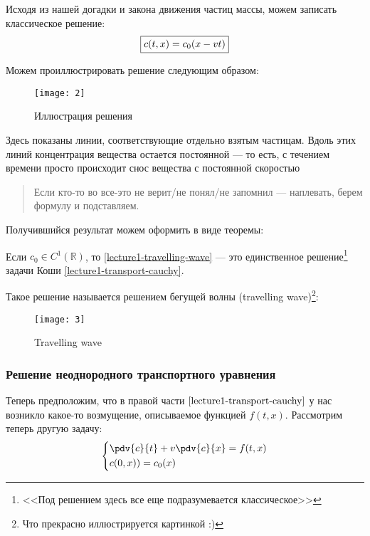 Исходя из нашей догадки и закона движения частиц массы, можем записать классическое решение:
%
\begin{equation}
  \boxed{%
    c(t, x) = c_0(x - vt)}
  \label{lecture1-travelling-wave}
\end{equation}

Можем проиллюстрировать решение следующим образом:

\begin{figure}[ht]
  \centering
  \texttt{[image: 2]}
  \caption{Иллюстрация решения}
\end{figure}
%
Здесь показаны линии, соответствующие отдельно взятым частицам. Вдоль этих линий концентрация вещества остается постоянной --- то есть, с течением времени просто происходит снос вещества с постоянной скоростью

\begin{quote}
  Если кто-то во все-это не верит/не понял/не запомнил --- наплевать, берем формулу и подставляем.
\end{quote}

Получившийся результат можем оформить в виде теоремы:
%
\begin{thm}
  Если $c_0 \in C^1(\mathbb{R})$, то \eqref{lecture1-travelling-wave} --- это единственное решение\footnote{<<Под решением здесь все еще подразумевается классическое>>} задачи Коши \eqref{lecture1-transport-cauchy}.
\end{thm}

Такое решение называется решением бегущей волны (travelling wave)\footnote{Что прекрасно иллюстрируется картинкой :)}:
%
\begin{figure}[ht]
  \centering
  \texttt{[image: 3]}
  \caption{Travelling wave}
\end{figure}

\subsubsection{Решение неоднородного транспортного уравнения}

Теперь предположим, что в правой части $\eqref{lecture1-transport-cauchy}$ у нас возникло какое-то возмущение, описываемое функцией $f(t, x)$. Рассмотрим теперь другую задачу:
%
\begin{equation}
  \left\{\begin{aligned}
    &\pdv{c}{t} + v \pdv{c}{x} = f(t, x) \\
    &c(0, x)) = c_0(x)
  \end{aligned}\right.
  \label{lecture1-transport-nonhom}
\end{equation}

